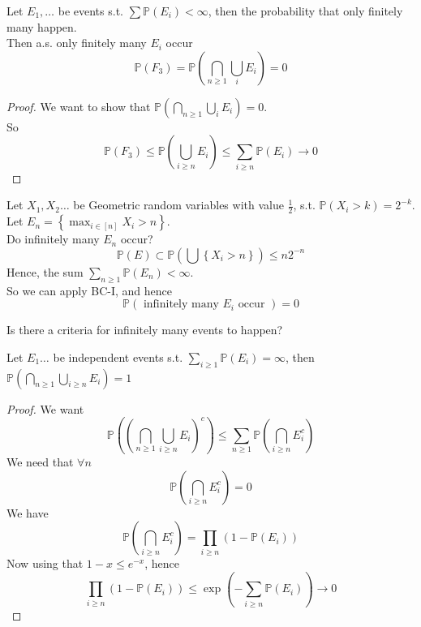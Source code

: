 \documentclass[../main.tex]{subfiles}
\begin{document}
\begin{thm}
	Let $E_1,\ldots$ be events s.t. $ \sum \mathbb{P}( E_i) < \infty $, then the probability that only finitely many happen.\\
	Then a.s. only finitely many $E_i$ occur
	\[ 
	\mathbb{P}( F_3) = \mathbb{P}( \bigcap_{n \geq 1} \bigcup_{i} E_i) =0
	\]
	
\end{thm}
\begin{proof}
We want to show that $\mathbb{P}( \bigcap_{n \geq 1} \bigcup_{i} E_i) =0$.\\
So 
\[ 
\mathbb{P}( F_3) \leq  \mathbb{P}( \bigcup_{i \geq n} E_i) \leq \sum_{i \geq n}^{ } \mathbb{P}( E_i) \to 0
\]

\end{proof}
\begin{exemple}
Let $X_1,X_2\ldots$ be Geometric random variables with value $\frac{1}{2}$, s.t. $ \mathbb{P} ( X_i>k )= 2^{-k}$.\\
Let $E_n= \left\{ \max_{i\in [ n] }  X_i >n \right\} $.\\
Do infinitely many $E_n$ occur?\\
\[ 
	\mathbb{P}( E) \subset \mathbb{P}( \bigcup \left\{ X_i>n \right\} ) \leq n 2^{-n}
\]
Hence, the sum $ \sum_{n \geq 1} \mathbb{P}( E_n) < \infty $.\\
So we can apply BC-I, and hence
\[ 
\mathbb{P}( \text{ infinitely many } E_i \text{ occur } ) =0
\]

\end{exemple}
Is there a criteria for infinitely many events to happen?
\begin{thm}
	Let $E_1\ldots$ be independent events s.t. $ \sum_{i \geq 1} \mathbb{P}( E_i) = \infty $, then $ \mathbb{P}( \bigcap_{n \geq 1} \bigcup_{i \geq n} E_i) = 1$ 
\end{thm}
\begin{proof}
We want
\[ 
\mathbb{P}( ( \bigcap_{n \geq 1} \bigcup_{i \geq n} E_i )^{c})  \leq \sum_{n \geq 1} \mathbb{P}( \bigcap_{i \geq n} E_i^{c} ) 
\]
We need that $\forall n$ 
\[ 
\mathbb{P}( \bigcap_{i \geq n} E_i^{c}) =0
\]
We have
\[ 
\mathbb{P}( \bigcap_{i \geq n} E_i^{c}) = \prod_{i \geq n} ( 1- \mathbb{P}( E_i) ) 
\]
Now using that $1-x \leq e^{-x} $, hence
\[ 
\prod_{i \geq n} ( 1- \mathbb{P}( E_i) ) \leq \exp( - \sum_{i \geq n}^{ } \mathbb{P}( E_i) )\to 0	 
\]

\end{proof}
\end{document}
